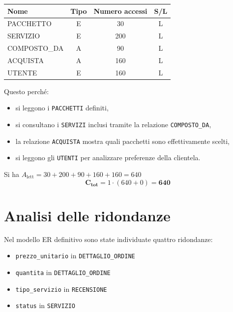 \documentclass[a4paper,12pt]{report}
\begin{document}
\begin{enumerate}
	      \begin{table}[H]
		      \centering
		      \small
		      \renewcommand{\arraystretch}{1.15}
		      \begin{tabularx}{0.8\textwidth}{|X|c|c|c|}
			      \hline
			      \rowcolor{gray!20}
			      \textbf{Nome} & \textbf{Tipo} & \textbf{Numero accessi} & \textbf{S/L} \\
			      \hline
			      PACCHETTO     & E             & 30                      & L            \\
			      SERVIZIO      & E             & 200                     & L            \\
			      COMPOSTO\_DA  & A             & 90                      & L            \\
			      ACQUISTA      & A             & 160                     & L            \\
			      UTENTE        & E             & 160                     & L            \\
			      \hline
		      \end{tabularx}
	      \end{table}

	      Questo perché:
	      \begin{itemize}
		      \item si leggono i \texttt{PACCHETTI} definiti,
		      \item si consultano i \texttt{SERVIZI} inclusi tramite la relazione \texttt{COMPOSTO\_DA},
		      \item la relazione \texttt{ACQUISTA} mostra quali pacchetti sono effettivamente scelti,
		      \item si leggono gli \texttt{UTENTI} per analizzare preferenze della clientela.
	      \end{itemize}

	      Si ha $A_{\text{lett}} = 30 + 200 + 90 + 160 + 160 = 640$
	      $$\mathbf{C_{tot}} = 1 \cdot (640 + 0) = \mathbf{640}$$
\end{enumerate}

\section{Analisi delle ridondanze}

Nel modello ER definitivo sono state individuate quattro ridondanze:
\begin{itemize}
	\item \texttt{prezzo\_unitario} in \texttt{DETTAGLIO\_ORDINE}
	\item \texttt{quantita} in \texttt{DETTAGLIO\_ORDINE}
	\item \texttt{tipo\_servizio} in \texttt{RECENSIONE}
	\item \texttt{status} in \texttt{SERVIZIO}
\end{itemize}
\end{document}
